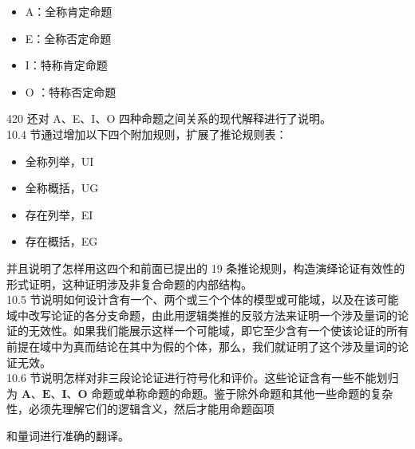 \begin{itemize}
  \item A：全称肯定命题
  \item E：全称否定命题
  \item I：特称肯定命题
  \item O ：特称否定命题
\end{itemize}

420 还对 A、E、I、O 四种命题之间关系的现代解释进行了说明。\\
10.4 节通过增加以下四个附加规则，扩展了推论规则表：

\begin{itemize}
  \item 全称列举，UI
  \item 全称概括，UG
  \item 存在列举，EI
  \item 存在概括，EG
\end{itemize}

并且说明了怎样用这四个和前面已提出的 19 条推论规则，构造演绎论证有效性的形式证明，这种证明涉及非复合命题的内部结构。\\
10.5 节说明如何设计含有一个、两个或三个个体的模型或可能域，以及在该可能域中改写论证的各分支命题，由此用逻辑类推的反驳方法来证明一个涉及量词的论证的无效性。如果我们能展示这样一个可能域，即它至少含有一个使该论证的所有前提在域中为真而结论在其中为假的个体，那么，我们就证明了这个涉及量词的论证无效。\\
10.6 节说明怎样对非三段论论证进行符号化和评价。这些论证含有一些不能划归为 $\mathbf{A 、 E 、 I 、 O}$ 命题或单称命题的命题。鉴于除外命题和其他一些命题的复杂性，必须先理解它们的逻辑含义，然后才能用命题函项

和量词进行准确的翻译。


